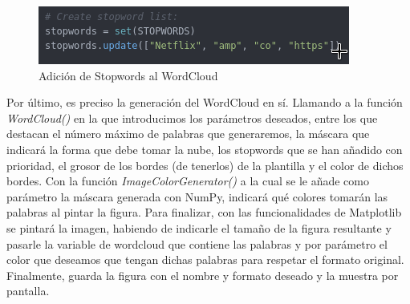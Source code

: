 \begin{figure}[H]
	\centering
	\includegraphics[scale=.7]{imagenes/stopword.png}
	\caption{Adición de Stopwords al WordCloud}
	\label{fig:stopwords}
\end{figure}


Por último, es preciso la generación del WordCloud en sí. Llamando a la función \textit{WordCloud()} en la que introducimos los parámetros deseados, entre los que destacan el número máximo de palabras que generaremos, la máscara que indicará la forma que debe tomar la nube, los stopwords que se han añadido con prioridad, el grosor de los bordes (de tenerlos) de la plantilla y el color de dichos bordes. Con la función \textit{ImageColorGenerator()} a la cual se le añade como parámetro la máscara generada con NumPy, indicará qué colores tomarán las palabras al pintar la figura. Para finalizar, con las funcionalidades de Matplotlib se pintará la imagen, habiendo de indicarle el tamaño de la figura resultante y pasarle la variable de wordcloud que contiene las palabras y por parámetro el color que deseamos que tengan dichas palabras para respetar el formato original. Finalmente, guarda la figura con el nombre y formato deseado y la muestra por pantalla. 












